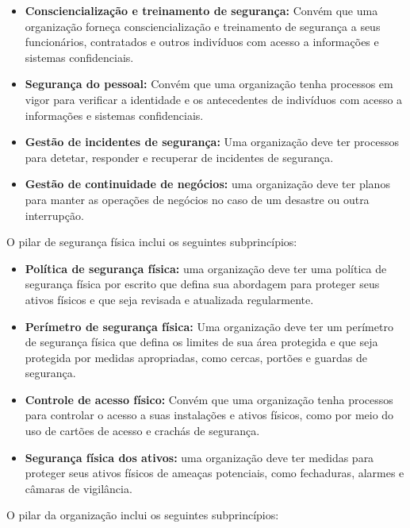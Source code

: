 \begin{itemize}
  \item \textbf{Consciencialização e treinamento de segurança: }Convém que uma organização forneça consciencialização e treinamento de segurança a seus funcionários, contratados e outros indivíduos com acesso a informações e sistemas confidenciais.
  \item \textbf{Segurança do pessoal: }Convém que uma organização tenha processos em vigor para verificar a identidade e os antecedentes de indivíduos com acesso a informações e sistemas confidenciais.
  \item \textbf{Gestão de incidentes de segurança: }Uma organização deve ter processos para detetar, responder e recuperar de incidentes de segurança.
  \item \textbf{Gestão de continuidade de negócios: }uma organização deve ter planos para manter as operações de negócios no caso de um desastre ou outra interrupção.
\end{itemize}

O pilar de segurança física inclui os seguintes subprincípios:

\begin{itemize}
  \item \textbf{Política de segurança física: }uma organização deve ter uma política de segurança física por escrito que defina sua abordagem para proteger seus ativos físicos e que seja revisada e atualizada regularmente.
  \item \textbf{Perímetro de segurança física: }Uma organização deve ter um perímetro de segurança física que defina os limites de sua área protegida e que seja protegida por medidas apropriadas, como cercas, portões e guardas de segurança.
  \item \textbf{Controle de acesso físico: }Convém que uma organização tenha processos para controlar o acesso a suas instalações e ativos físicos, como por meio do uso de cartões de acesso e crachás de segurança.
  \item \textbf{Segurança física dos ativos: }uma organização deve ter medidas para proteger seus ativos físicos de ameaças potenciais, como fechaduras, alarmes e câmaras de vigilância.
\end{itemize}

O pilar da organização inclui os seguintes subprincípios:

